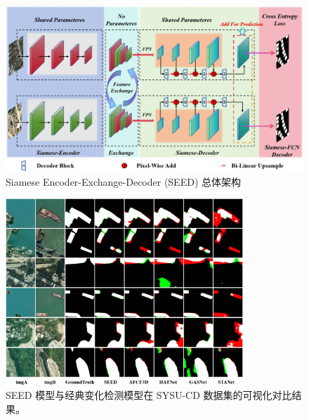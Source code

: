 \begin{figure}[!htbp]
  \centering
  \includegraphics[width=\textwidth]{paper_figures/变化检测任务基础范式设计/SEED_Framework.png}
  \caption{Siamese Encoder-Exchange-Decoder (SEED) 总体架构}
  \label{fig:SEED_Framework}
\end{figure}

\begin{figure}[!htbp]
  \centering
  \includegraphics[width=0.8\textwidth]{paper_figures/变化检测任务基础范式设计/seed_sysu.png}
  \caption{ SEED 模型与经典变化检测模型在 SYSU-CD 数据集的可视化对比结果。}
  \label{fig:seed_sysu}
\end{figure}


